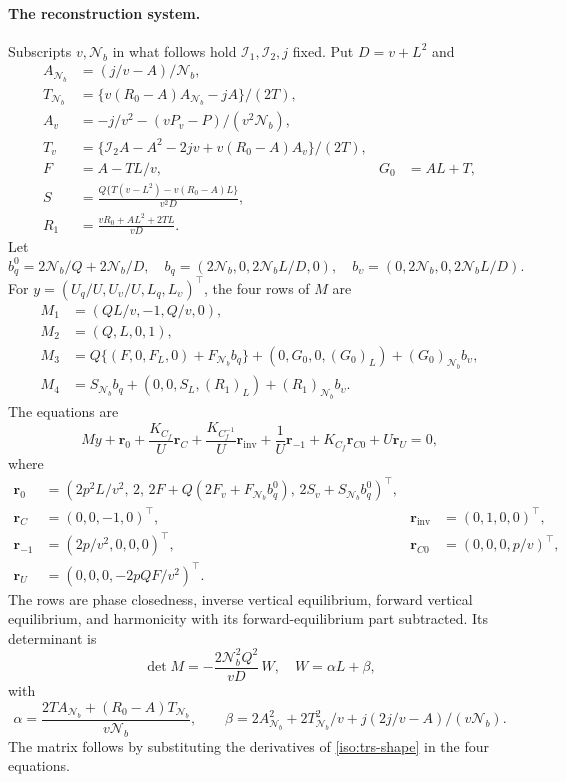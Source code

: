 \documentclass[11pt,a4paper]{article}
\numberwithin{equation}{section}
\theoremstyle{plain}
\theoremstyle{definition}
\theoremstyle{remark}
\begin{document}
\paragraph{The reconstruction system.}
  Subscripts $v,\mathcal N_b$
in what follows hold $\mathcal I_1,\mathcal I_2,j$ fixed.  Put $D=v+L^2$ and
\begin{align*}
 A_{\mathcal N_b}&=(j/v-A)/\mathcal N_b,\\
 T_{\mathcal N_b}&=\{v(R_0-A)A_{\mathcal N_b}-jA\}/(2T),\\
 A_v&=-j/v^2-(vP_v-P)/(v^2\mathcal N_b),\\
 T_v&=\{\mathcal I_2A-A^2-2jv+v(R_0-A)A_v\}/(2T),\\
 F&=A-TL/v,&G_0&=AL+T,\\
 S&=\frac{Q\{T(v-L^2)-v(R_0-A)L\}}{v^2D},\\
 R_1&=\frac{vR_0+AL^2+2TL}{vD}.
\end{align*}
Let
\[
 b_q^0=2\mathcal N_b/Q+2\mathcal N_b/D,\quad
 b_q=(2\mathcal N_b,0,2\mathcal N_b L/D,0),\quad b_\upsilon=(0,2\mathcal N_b,0,2\mathcal N_b L/D).
\]
For $y=(U_q/U,U_\upsilon/U,L_q,L_\upsilon)^{\top}$, the four rows of $M$ are
\begin{align*}
 M_1&=(QL/v,-1,Q/v,0),\\
 M_2&=(Q,L,0,1),\\
 M_3&=Q\{(F,0,F_L,0)+F_{\mathcal N_b}b_q\}
                  +(0,G_0,0,(G_0)_L)+(G_0)_{\mathcal N_b}b_\upsilon,\\
 M_4&=S_{\mathcal N_b}b_q+(0,0,S_L,(R_1)_L)+(R_1)_{\mathcal N_b}b_\upsilon.
\end{align*}
The equations are
\begin{equation}\label{iso:trs-matrix}
 My+\boldsymbol r_0+\frac{K_{C_f}}{U}\boldsymbol r_C+\frac{K_{C_f^{-1}}}{U}\boldsymbol r_{\mathrm{inv}}
       +\frac1U \boldsymbol r_{-1}+K_{C_f}\boldsymbol r_{C0}+U\boldsymbol r_U=0,
\end{equation}
where
\begin{align*}
 \boldsymbol r_0&=(2p^2L/v^2,\,2,\,2F+Q(2F_v+F_{\mathcal N_b}b_q^0),\,
                           2S_v+S_{\mathcal N_b}b_q^0)^{\top},\\
 \boldsymbol r_C&=(0,0,-1,0)^{\top},&\boldsymbol r_{\mathrm{inv}}&=(0,1,0,0)^{\top},\\
 \boldsymbol r_{-1}&=(2p/v^2,0,0,0)^{\top},&\boldsymbol r_{C0}&=(0,0,0,p/v)^{\top},\\
 \boldsymbol r_U&=(0,0,0,-2pQF/v^2)^{\top}.
\end{align*}
The rows are phase closedness, inverse vertical equilibrium, forward
vertical equilibrium, and harmonicity with its forward-equilibrium part
subtracted.  Its determinant is
\begin{equation}\label{iso:trs-wall}
 \det M=-\frac{2\mathcal N_b^2Q^2}{vD}\,W,\quad
 W=\alpha L+\beta,
\end{equation}
with
\[
 \alpha=\frac{2TA_{\mathcal N_b}+(R_0-A)T_{\mathcal N_b}}{v\mathcal N_b},\qquad
 \beta=2A_{\mathcal N_b}^2+2T_{\mathcal N_b}^2/v+j(2j/v-A)/(v\mathcal N_b).
\]
The matrix follows by substituting the derivatives of \eqref{iso:trs-shape} in the four equations.
\end{document}
